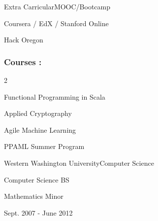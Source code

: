\documentclass{article}
\newenvironment{mylist}[2]{
  \subsubsection*{#1}
  \begin{multicols}{#2}
  \small
  \begin{list}{}{}
   \setlength{\topsep}{0pt}
   \setlength{\itemsep}{1pt}
   \setlength{\parskip}{0pt}
   \setlength{\parsep}{0pt}}{\end{list}\end{multicols}\normalsize}
\newenvironment{*mylist}[2]{
  \subsection*{#1\hfill#2}
  \small
  \begin{list}{}{}
   \setlength{\topsep}{0pt}
   \setlength{\itemsep}{1pt}
   \setlength{\parskip}{0pt}
   \setlength{\parsep}{0pt}}{\end{list}\normalsize}
\begin{document}
\begin{*mylist}{Extra Carricular}{MOOC/Bootcamp}
\item Coursera / EdX / Stanford Online
\item Hack Oregon
\end{*mylist}

\begin{mylist}{Courses :}{2}
\item Functional Programming in Scala
\item Applied Cryptography
\item Agile Machine Learning
\item PPAML Summer Program
\end{mylist}

\begin{comment}
\subsection*{Continued Education}

\begin{mylist}{Courses :}{2}
\item Agile Machine Learning
\item Functional Programming in Scala
\item Applied Cryptography
\end{mylist}
\end{comment}

\begin{*mylist}{Western Washington University}{Computer Science}
\item Computer Science BS
\item Mathematics Minor
\item Sept. 2007 - June 2012
\end{*mylist}
\end{document}
